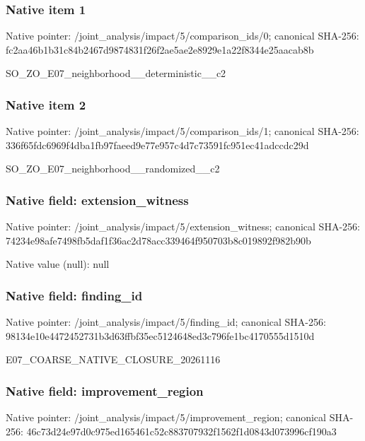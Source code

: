 \documentclass[10pt,a4paper]{article}
\begin{document}
\subsubsection{Native item 1}
Native pointer: /joint\_\allowbreak{}analysis/impact/5/comparison\_\allowbreak{}ids/0; canonical SHA-256: fc2aa46b1b31c84b2467d9874831f26f2ae5ae2e8929e1a22f8344e25aacab8b

\begingroup\raggedright\sloppy SO\_\allowbreak{}ZO\_\allowbreak{}E07\_\allowbreak{}neighborhood\_\allowbreak{}\_\allowbreak{}deterministic\_\allowbreak{}\_\allowbreak{}c2\par\endgroup

\subsubsection{Native item 2}
Native pointer: /joint\_\allowbreak{}analysis/impact/5/comparison\_\allowbreak{}ids/1; canonical SHA-256: 336f65fdc6969f4dba1fb97faeed9e77e957c4d7c73591fc951ec41adccdc29d

\begingroup\raggedright\sloppy SO\_\allowbreak{}ZO\_\allowbreak{}E07\_\allowbreak{}neighborhood\_\allowbreak{}\_\allowbreak{}randomized\_\allowbreak{}\_\allowbreak{}c2\par\endgroup

\subsubsection{Native field: extension\_\allowbreak{}witness}
Native pointer: /joint\_\allowbreak{}analysis/impact/5/extension\_\allowbreak{}witness; canonical SHA-256: 74234e98afe7498fb5daf1f36ac2d78acc339464f950703b8c019892f982b90b

Native value (null): null

\subsubsection{Native field: finding\_\allowbreak{}id}
Native pointer: /joint\_\allowbreak{}analysis/impact/5/finding\_\allowbreak{}id; canonical SHA-256: 98134e10e4472452731b3d63ffbf35ec5124648ed3c796fe1bc4170555d1510d

\begingroup\raggedright\sloppy E07\_\allowbreak{}COARSE\_\allowbreak{}NATIVE\_\allowbreak{}CLOSURE\_\allowbreak{}20261116\par\endgroup

\subsubsection{Native field: improvement\_\allowbreak{}region}
Native pointer: /joint\_\allowbreak{}analysis/impact/5/improvement\_\allowbreak{}region; canonical SHA-256: 46c73d24e97d0c975ed165461c52c883707932f1562f1d0843d073996cf190a3
\end{document}
